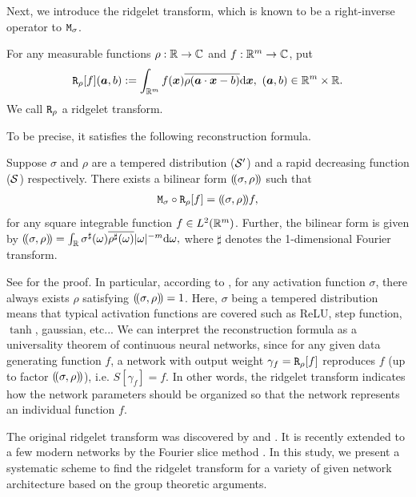 Next, we introduce the ridgelet transform, which is known to be a right-inverse operator to $\mathtt{M}_\sigma$.
\begin{definition}
	For any measurable functions $\rho:\mathbb{R}\to\mathbb{C}$ and $f:\mathbb{R}^m\to\mathbb{C}$, put
	\begin{align*}
		\mathtt{R}_\rho[f](\bm{a},b) := \int_{\mathbb{R}^m} f(\bm{x}) \overline{\rho(\bm{a}\cdot\bm{x}-b)} \mathrm{d} \bm{x}, \ (\bm{a},b) \in \mathbb{R}^m \times \mathbb{R}. 
	\end{align*}    
	We call $\mathtt{R}_\rho$ a ridgelet transform.
\end{definition}
To be precise, it satisfies the following reconstruction formula.
\begin{theorem} \label{thm:reconst.ridgelet}
	Suppose $\sigma$ and $\rho$ are a tempered distribution ($\mathcal{S}'$) and a rapid decreasing function ($\mathcal{S}$) respectively.
	There exists a bilinear form $(\!(\sigma,\rho)\!)$ such that 
	\begin{align*}
		\mathtt{M}_\sigma \circ \mathtt{R}_\rho [f] = (\!(\sigma,\rho)\!) f,
	\end{align*}
	for any square integrable function $f \in L^2(\mathbb{R}^m)$. Further, the bilinear form is given by
		$(\!(\sigma,\rho)\!) = \int_{\mathbb{R}} \sigma^\sharp(\omega) \overline{\rho^\sharp(\omega)} |\omega|^{-m}\mathrm{d}\omega,$
	where $\sharp$ denotes the 1-dimensional Fourier transform.
\end{theorem}
See \citet[Theorem~6]{Sonoda2021ghost} for the proof.
In particular, according to \citet[Lemma~9]{Sonoda2021ghost}, for any activation function $\sigma$, there always exists $\rho$ satisfying $(\!(\sigma,\rho)\!)=1$. 
Here, $\sigma$ being a tempered distribution means that typical activation functions are covered such as ReLU, step function, $\tanh$, gaussian, etc...
We can interpret the reconstruction formula as a universality theorem of continuous neural networks, since for any given data generating function $f$, a network with output weight $\gamma_f = \mathtt{R}_\rho[f]$ reproduces $f$ (up to factor $(\!(\sigma,\rho)\!)$), i.e. $S[\gamma_f] = f$. In other words, the ridgelet transform indicates how the network parameters should be organized so that the network represents an individual function $f$. 

The original ridgelet transform was discovered by \citet{Murata1996} and \citet{Candes.PhD}. It is recently extended to a few modern networks by the Fourier slice method \citep[see e.g.][]{Sonoda2024fourier}.
In this study, we present a systematic scheme to find the ridgelet transform for a variety of given network architecture based on the group theoretic arguments.
